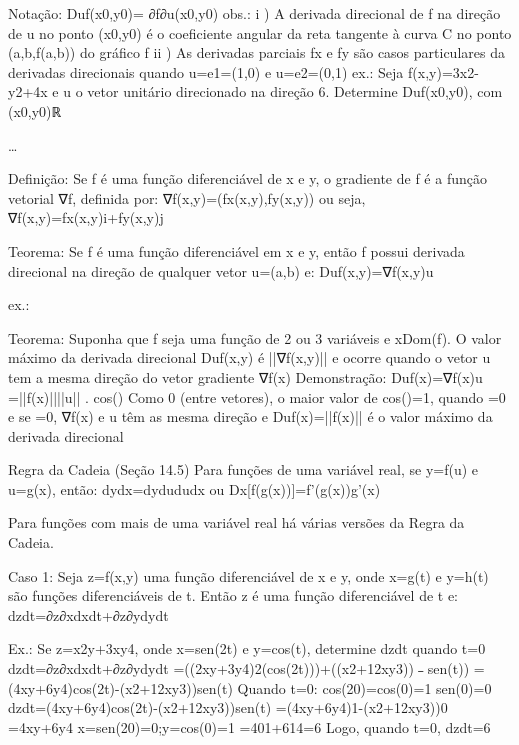 {{{Notação:
    Duf(x0,y0)= ∂f∂u(x0,y0)
    obs.: 
        i ) A derivada direcional de f na direção de u no ponto (x0,y0) é o coeficiente angular da reta tangente à 
            curva C no ponto (a,b,f(a,b)) do gráfico f
        ii ) As derivadas parciais fx e fy são casos particulares da derivadas direcionais quando u=e1=(1,0) 
            e u=e2=(0,1)
ex.: Seja f(x,y)=3x2-y2+4x e u o vetor unitário direcionado na direção 6. Determine Duf(x0,y0), com (x0,y0)ℝ

…

Definição:
    Se f é uma função diferenciável de x e y, o gradiente de f é a função vetorial ∇f, definida por:
            ∇f(x,y)=(fx(x,y),fy(x,y)) ou seja, ∇f(x,y)=fx(x,y)i+fy(x,y)j

Teorema:
    Se f é uma função diferenciável em x e y, então f possui derivada direcional na direção de qualquer vetor u=(a,b) e:
        Duf(x,y)=∇f(x,y)u

ex.:












Teorema:
    Suponha que f seja uma função de 2 ou 3 variáveis e xDom(f). O valor máximo da derivada direcional Duf(x,y) é ||∇f(x,y)|| e ocorre quando o vetor u tem a mesma direção do vetor gradiente ∇f(x)
    Demonstração:
        Duf(x)=∇f(x)u
                   =||f(x)||||u|| . cos()
        Como 0 (entre vetores), o maior valor de cos()=1, quando =0 e se =0, ∇f(x) e u têm as mesma direção e Duf(x)=||f(x)|| é o valor máximo da derivada direcional

Regra da Cadeia (Seção 14.5)
Para funções de uma variável real, se y=f(u) e u=g(x), então:
    dydx=dydududx
ou
    Dx[f(g(x))]=f'(g(x))g'(x)

Para funções com mais de uma variável real há várias versões da Regra da Cadeia.

Caso 1:
    Seja z=f(x,y) uma função diferenciável de x e y, onde x=g(t) e y=h(t) são funções diferenciáveis de t. Então z é uma função diferenciável de t e:
        dzdt=∂z∂xdxdt+∂z∂ydydt

    Ex.: Se z=x2y+3xy4, onde x=sen(2t) e y=cos(t), determine dzdt quando t=0
            dzdt=∂z∂xdxdt+∂z∂ydydt
                =((2xy+3y4)2(cos(2t)))+((x2+12xy3))﹣sen(t))
                =(4xy+6y4)cos(2t)-(x2+12xy3))sen(t)
            Quando t=0:
                cos(20)=cos(0)=1
                sen(0)=0
                dzdt=(4xy+6y4)cos(2t)-(x2+12xy3))sen(t)
                    =(4xy+6y4)1-(x2+12xy3))0
                    =4xy+6y4      x=sen(20)=0;y=cos(0)=1
                    =401+614=6
            Logo, quando t=0, dzdt=6

}}}
